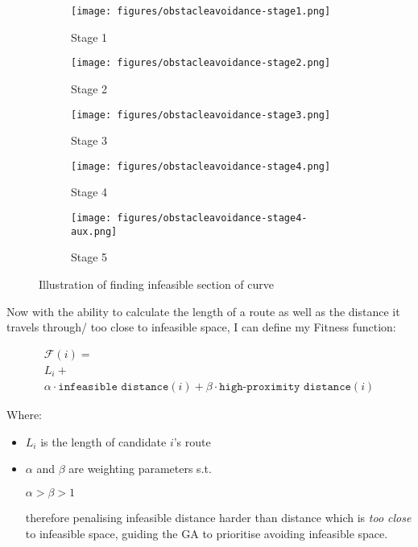 \begin{figure}
  \centering
  \begin{subfigure}[b]{0.44\textwidth}
    \centering
    \texttt{[image: figures/obstacleavoidance-stage1.png]}
    \caption{Stage 1}
  \end{subfigure}
  \begin{subfigure}[b]{0.44\textwidth}
    \centering
    \texttt{[image: figures/obstacleavoidance-stage2.png]}
    \caption{Stage 2}
  \end{subfigure}
  \begin{subfigure}[b]{0.44\textwidth}
    \centering
    \texttt{[image: figures/obstacleavoidance-stage3.png]}
    \caption{Stage 3}
  \end{subfigure}
  \begin{subfigure}[b]{0.44\textwidth}
    \centering
    \texttt{[image: figures/obstacleavoidance-stage4.png]}
    \caption{Stage 4}
  \end{subfigure}
  \begin{subfigure}[b]{0.44\textwidth}
    \centering
    \texttt{[image: figures/obstacleavoidance-stage4-aux.png]}
    \caption{Stage 5}
  \end{subfigure}
  \caption{\label{fig:ifspace-illustration} Illustration of finding infeasible section of curve}
\end{figure}

Now with the ability to calculate the length of a route as well as the distance it travels through/ too close to infeasible space, I can define my Fitness function:

\begin{multline}
  \mathcal{F}(i) = \\
  L_{i} +\\
  \alpha \cdot \texttt{infeasible distance}(i) + \beta \cdot \texttt{high-proximity distance}(i)
\end{multline}

Where:
\begin{itemize}
  \item $L_{i}$ is the length of candidate $i$'s route
  \item \(\alpha\) and \(\beta\) are weighting parameters s.t.

        $\alpha > \beta > 1$

        therefore penalising infeasible distance harder than distance which is \textit{too close} to infeasible space, guiding the GA to prioritise avoiding infeasible space.
\end{itemize}

